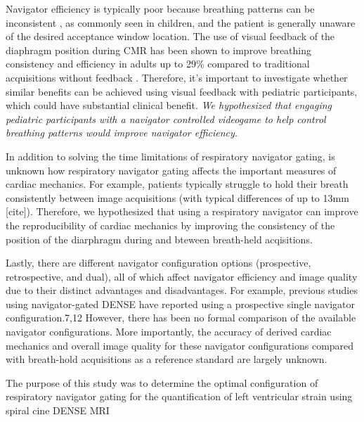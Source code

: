 	Navigator efficiency is typically poor because breathing patterns can be inconsistent \cite{Liu1993,Wang1995a,Taylor1997a}, as commonly seen in children, and the patient is generally unaware of the desired acceptance window location. The use of visual feedback of the diaphragm position during CMR has been shown to improve breathing consistency and efficiency in adults up to 29\% compared to traditional acquisitions without feedback \cite{Feuerlein2009,Jhooti2011}. Therefore, it's important to investigate whether similar benefits can be achieved using visual feedback with pediatric participants, which could have substantial clinical benefit. \textit{We hypothesized that engaging pediatric participants with a navigator controlled videogame to help control breathing patterns would improve navigator efficiency.}
	
	In addition to solving the time limitations of respiratory navigator gating, is unknown how respiratory navigator gating affects the important measures of cardiac mechanics. For example, patients typically struggle to hold their breath consistently between image acquisitions (with typical differences of up to 13mm [cite]). Therefore, we hypothesized that using a respiratory navigator can improve the reproducibility of cardiac mechanics by improving the consistency of the position of the diarphragm during and bteween breath-held acqisitions.
	
	Lastly, there are different navigator configuration options (prospective, retrospective, and dual), all of which affect navigator efficiency and image quality due to their distinct advantages and disadvantages. For example, previous studies using navigator-gated DENSE have reported using a prospective single navigator configuration.7,12 However, there has been no formal comparison of the available navigator configurations. More importantly, the accuracy of derived cardiac mechanics and overall image quality for these navigator configurations compared with breath-hold acquisitions as a reference standard are largely unknown.
	
	The purpose of this study was to determine the optimal configuration of respiratory navigator gating for the quantification of left ventricular strain using spiral cine DENSE MRI
	
